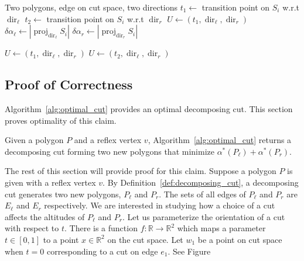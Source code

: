 \documentclass[../main.tex]{subfiles}
\begin{document}
\begin{algorithm}
	\caption{$\operatorname{get\_cands}(P_{\ell}, P_r, S_i, \operatorname{dir}_{\ell}, \operatorname{dir}_r)$}
	\label{alg:find_candidate}
	\begin{algorithmic}[1]
		\REQUIRE Two polygons, edge on cut space, two directions
			\STATE $t_1\gets$ transition point on $S_i$ w.r.t $\operatorname{dir}_{\ell}$	\label{line:cand_trans_pt}
			\STATE $t_2\gets$ transition point on $S_i$ w.r.t $\operatorname{dir}_r$ \label{line:cand_trans_pt_2}
			\label{line:cand_if}
				\STATE $U\gets(t_1, \operatorname{dir}_{\ell}, \operatorname{dir}_r)$
			\ELSE \label{line:cand_else}
				\STATE $\delta\alpha_{\ell}\gets |\operatorname{proj}_{\operatorname{dir}_{\ell}}S_i|$
				\STATE $\delta\alpha_r\gets |\operatorname{proj}_{\operatorname{dir}_r}S_i|$

					\STATE $U\gets(t_1, \operatorname{dir}_{\ell}, \operatorname{dir}_r)$
				\ELSE
					\STATE $U\gets(t_2, \operatorname{dir}_{\ell}, \operatorname{dir}_r)$
				\ENDIF
			\ENDIF
	\end{algorithmic}
\end{algorithm}

\subsection{Proof of Correctness}
\label{sec:proof_of_correctness}

Algorithm~\ref{alg:optimal_cut} provides an optimal decomposing cut. This section proves optimality of this claim.

\begin{claim}
Given a polygon $P$ and a reflex vertex $v$, Algorithm~\ref{alg:optimal_cut} returns a decomposing cut forming two new polygons that minimize $\alpha^*(P_{\ell})+\alpha^*(P_r)$.
\end{claim}

The rest of this section will provide proof for this claim. Suppose a polygon $P$ is given with a reflex vertex $v$. By Definition~\ref{def:decomposing_cut}, a decomposing cut generates two new polygons, $P_{\ell}$ and $P_r$. The sets of all edges of $P_{\ell}$ and $P_r$ are $E_{\ell}$ and $E_r$ respectively. We are interested in studying how a choice of a cut affects the altitudes of $P_{\ell}$ and $P_r$. Let us parameterize the orientation of a cut with respect to $t$. There is a function $f:\mathbb{R}\to\mathbb{R}^2$ which maps a parameter $t\in[0,1]$ to a point $x\in\mathbb{R}^2$ on the cut space. Let $w_1$ be a point on cut space when $t=0$ corresponding to a cut on edge $e_1$. See Figure~%
\end{document}
